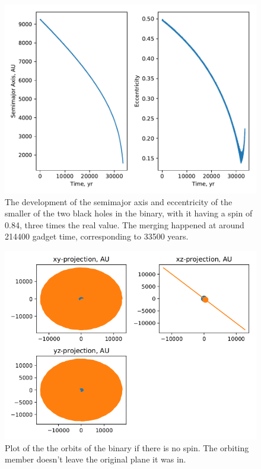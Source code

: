 \documentclass[english, oneside]{HYgradu}
\begin{document}
\begin{figure}[h!tb]
\centering
\includegraphics[width=\textwidth]{../images/spin3.pdf}
\caption{The development of the semimajor axis and eccentricity of the smaller of the two black holes in the binary, with it having a spin of 0.84, three times the real value. The merging happened at around 214400 gadget time, corresponding to 33500 years.}
\label{fig:spin3}
\end{figure}

\begin{figure}[h!tb]
\centering
\includegraphics[width=\textwidth]{../images/spin0Orbits.png}
\caption{Plot of the the orbits of the binary if there is no spin. The orbiting member doesn't leave the original plane it was in.}
\label{fig:spin0Orbits}
\end{figure}
\end{document}
